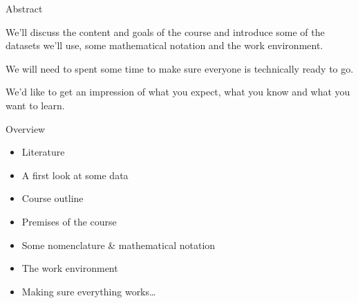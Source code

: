 \documentclass[mathserif, aspectratio=169]{beamer}
\subtitle{\bfseries%
  {Introduction\\\it Course Overview \& Work Environment}\\%
  {\tiny\it course content \& goals, a look at some data, mathematical notation, technicalities, getting ready}\\%
}
\begin{document}


\begin{frame}{Abstract}

	\begin{blurb}
			We'll discuss the content and goals of the course and introduce 
			some of the datasets we'll use, some mathematical notation and 
			the work environment.

			We will need to spent some time to make sure everyone is
			technically ready to go. 

			We'd like to get an impression of what you expect, what you know
			and what you want to learn.  
	\end{blurb}
\end{frame}

\begin{frame}{Overview}
	\begin{itemize}
		\item Literature
		\item A first look at some data
		\item Course outline
		\item Premises of the course
		\item Some nomenclature \& mathematical notation
		\item The work environment
		\item Making sure everything works\dots
	\end{itemize}
\end{frame}
\end{document}
